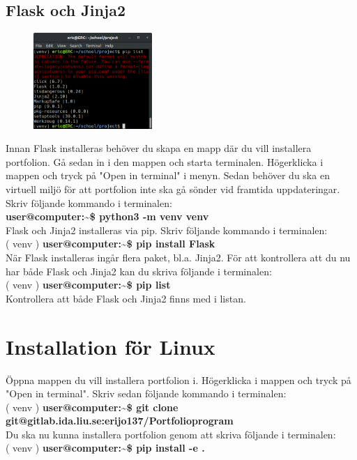 \documentclass{TDP003mall}
\begin{document}
\newpage
\subsection{Flask och Jinja2}
\begin{figure}
    \begin{center}
        \includegraphics[width=0.40\textwidth]{./list2.png}
    \end{center}
\end{figure}
Innan Flask installeras behöver du skapa en mapp där du vill installera portfolion. Gå sedan in i den mappen och starta terminalen. Högerklicka i mappen och tryck på "Open in terminal" i menyn. Sedan behöver du ska en virtuell miljö för att portfolion inte ska gå sönder vid framtida uppdateringar. Skriv följande kommando i terminalen:\\
\textbf{\textcolor{terminalgreen}{user@computer}:\~{}\$ python3 -m venv venv}\\
Flask och Jinja2 installeras via pip. Skriv följande kommando i terminalen:\\
( venv ) \textbf{\textcolor{terminalgreen}{user@computer}:\~{}\$ pip install Flask}\\
När Flask installeras ingår flera paket, bl.a. Jinja2.
För att kontrollera att du nu har både Flask och Jinja2 kan du skriva följande i terminalen:\\
( venv ) \textbf{\textcolor{terminalgreen}{user@computer}:\~{}\$ pip list}\\
Kontrollera att både Flask och Jinja2 finns med i listan.
\section{Installation för Linux}
Öppna mappen du vill installera portfolion i. Högerklicka i mappen och tryck på "Open in terminal". Skriv sedan följande kommando i terminalen:\\
( venv ) \textbf{\textcolor{terminalgreen}{user@computer}:\~{}\$ git clone git@gitlab.ida.liu.se:erijo137/Portfolioprogram}\\
Du ska nu kunna installera portfolion genom att skriva följande i terminalen:\\
( venv ) \textbf{\textcolor{terminalgreen}{user@computer}:\~{}\$ pip install -e .}\\
\end{document}
